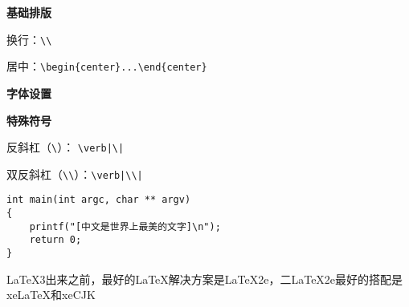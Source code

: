 \documentclass{article}
\begin{document}
\noindent
\textbf{\large{基础排版}}

\indent
换行：\verb=\\=

居中：\verb=\begin{center}...\end{center}=


\noindent
\textbf{\large{字体设置}}



\noindent
\textbf{\large{特殊符号}}

反斜杠（\verb|\|）： \verb=\verb|\|=

双反斜杠（\verb|\\|）：\verb=\verb|\\|=




\begin{lstlisting}[language={[ANSI]C}]
int main(int argc, char ** argv) 
{ 
    printf("[中文是世界上最美的文字]\n"); 
    return 0; 
} 
\end{lstlisting}


LaTeX3出来之前，最好的LaTeX解决方案是LaTeX2e，二LaTeX2e最好的搭配是xeLaTeX和xeCJK
\end{document}
